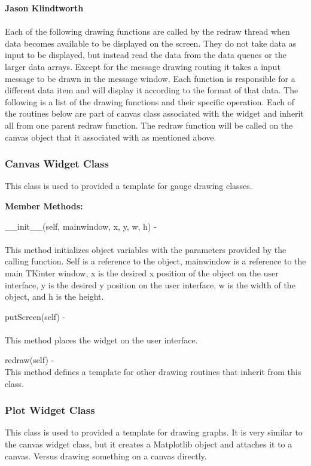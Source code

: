 \documentclass[10pt,draftclsnofoot,onecolumn,compsoc]{IEEEtran}
\begin{document}
{\bf Jason Klindtworth }
\\ \\
Each of the following drawing functions are called by the redraw thread when data becomes available to be displayed on the screen. They do not take data as input to be displayed, but instead read the data from the data queues or the larger data arrays. Except for the message drawing routing it takes a input message to be drawn in the message window. Each function is responsible for a different data item and will display it according to the format of that data. The following is a list of the drawing functions and their specific operation. Each of the routines below are part of canvas class associated with the widget and inherit all from one parent redraw function. The redraw function will be called on the canvas object that it associated with as mentioned above.

\subsubsection{Canvas Widget Class}
This class is used to provided a template for gauge drawing classes.

{\bf Member Methods:} \par

 \_\_init\_\_(self, mainwindow, x, y, w, h) - \\ \\
This method initializes object variables with the parameters provided by the calling function. Self is a reference to the object, mainwindow is a reference to the main TKinter window, x is the desired x position of the object on the user interface, y is the desired y position on the user interface, w is the width of the object, and h is the height. \par

putScreen(self) - \\ \\
This method places the widget on the user interface. \par

redraw(self) - \\
This method defines a template for other drawing routines that inherit from this class.

\subsubsection{Plot Widget Class}
This class is used to provided a template for drawing graphs. It is very similar to the canvas widget class, but it creates a Matplotlib object and attaches it to a canvas. Versus drawing something on a canvas directly.
\end{document}
